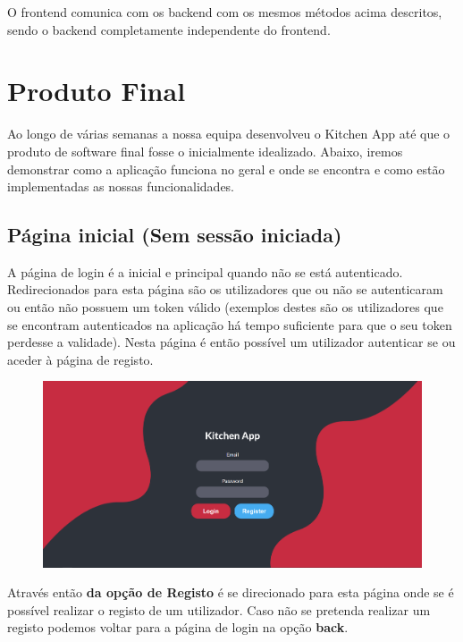 \documentclass[a4paper]{report}
\begin{document}
O frontend comunica com os backend com os mesmos métodos acima descritos,
sendo o backend completamente independente do frontend.

\chapter{Produto Final}

    Ao longo de várias semanas a nossa equipa desenvolveu o Kitchen App até que
    o produto de software final fosse o inicialmente idealizado. Abaixo, iremos
    demonstrar como a aplicação funciona no geral e onde se encontra e como
    estão implementadas as nossas funcionalidades.

    \section{Página inicial (Sem sessão iniciada)}
    A página de login é a inicial e principal quando não se está 
    autenticado. Redirecionados para esta página são os utilizadores que
    ou não se autenticaram ou então não possuem um token válido (exemplos destes 
    são os utilizadores que se encontram autenticados na aplicação há tempo
    suficiente para que o seu token perdesse a validade). Nesta página é 
    então possível um utilizador autenticar se ou aceder à página de registo.

    \begin{figure}[H]
        \centering
            \includegraphics[width=\textwidth]{images/produto_final/login.png}
    \end{figure}

    Através então \textbf{da opção de Registo} é se direcionado para esta 
    página onde se é possível realizar o registo de um utilizador. Caso 
    não se pretenda realizar um registo podemos voltar para a página de login
    na opção \textbf{back}.
\end{document}
